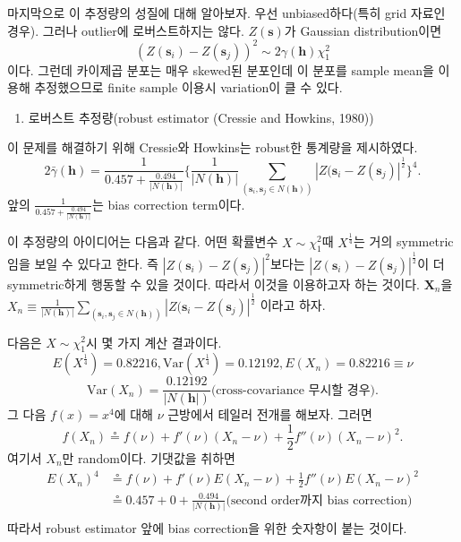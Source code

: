 \documentclass[b5paper,]{scrbook}
\providecommand{\tightlist}{%
  \setlength{\itemsep}{0pt}\setlength{\parskip}{0pt}}
\theoremstyle{plain}
\theoremstyle{definition}
\numberwithin{equation}{section}
\begin{document}
마지막으로 이 추정량의 성질에 대해 알아보자. 우선 unbiased하다(특히 grid
자료인 경우). 그러나 outlier에 로버스트하지는 않다. \(Z(\mathbf{s})\)가
Gaussian distribution이면
\[(Z(\mathbf{s}_{i})-Z(\mathbf{s}_{j}))^{2} \sim 2 \gamma(\mathbf{h})\chi_{1}^{2}\]
이다. 그런데 카이제곱 분포는 매우 skewed된 분포인데 이 분포를 sample
mean을 이용해 추정했으므로 finite sample 이용시 variation이 클 수 있다.

\begin{enumerate}
\def\labelenumi{\arabic{enumi}.}
\setcounter{enumi}{1}
\tightlist
\item
  로버스트 추정량(robust estimator (Cressie and Howkins, 1980))
\end{enumerate}

이 문제를 해결하기 위해 Cressie와 Howkins는 robust한 통계량을
제시하였다.
\[2 \bar{\gamma}(\mathbf{h})=\frac{1}{0.457+\frac{0.494}{|N(\mathbf{h})|}}\{\frac{1}{|N(\mathbf{h})|}\sum_{(\mathbf{s}_{i},\mathbf{s}_{j} \in N(\mathbf{h}))} |Z(\mathbf{s}_{i}-Z(\mathbf{s}_{j})|^{\frac{1}{2}}\}^{4}.\]
앞의 \(\frac{1}{0.457+\frac{0.494}{|N(\mathbf{h})|}}\)는 bias correction
term이다.

이 추정량의 아이디어는 다음과 같다. 어떤 확률변수
\(X \sim \chi_{1}^{2}\)때 \(X^{\frac{1}{4}}\)는 거의 symmetric임을 보일
수 있다고 한다. 즉 \(|Z(\mathbf{s}_{i})-Z(\mathbf{s}_{j})|^{2}\)보다는
\(|Z(\mathbf{s}_{i})-Z(\mathbf{s}_{j})|^{\frac{1}{2}}\)이 더
symmetric하게 행동할 수 있을 것이다. 따라서 이것을 이용하고자 하는
것이다. \(\mathbf{X}_{n}\)을
\(X_{n}\equiv\frac{1}{|N(\mathbf{h})|}\sum_{(\mathbf{s}_{i},\mathbf{s}_{j} \in N(\mathbf{h}))} |Z(\mathbf{s}_{i}-Z(\mathbf{s}_{j})|^{\frac{1}{2}}\)
이라고 하자.

다음은 \(X \sim \chi_{1}^{2}\)시 몇 가지 계산 결과이다.
\[E(X^{\frac{1}{4}})=0.82216, \text{Var}(X^{\frac{1}{4}})=0.12192, E(X_{n})=0.82216 \equiv \nu\]
\[\text{Var}(X_{n})=\frac{0.12192}{|N(\mathbf{h}|)} \text{(cross-covariance 무시할 경우)} .\]
그 다음 \(f(x)=x^{4}\)에 대해 \(\nu\) 근방에서 테일러 전개를 해보자.
그러면
\[f(X_{n})\circeq f(\nu) +f'(\nu)(X_{n}-\nu)+\frac{1}{2}f''(\nu)(X_{n}-\nu)^{2} .\]
여기서 \(X_{n}\)만 random이다. 기댓값을 취하면 \[
\begin{aligned}
E(X_{n})^{4}&\circeq f(\nu) + f'(\nu)E(X_{n}-\nu) +\frac{1}{2}f''(\nu)E(X_{n}-\nu)^{2}\\
&\circeq 0.457 + 0 +\frac{0.494}{|N(\mathbf{h})|} \text{(second order까지 bias correction)}\\
\end{aligned}
\] 따라서 robust estimator 앞에 bias correction을 위한 숫자항이 붙는
것이다.
\end{document}
